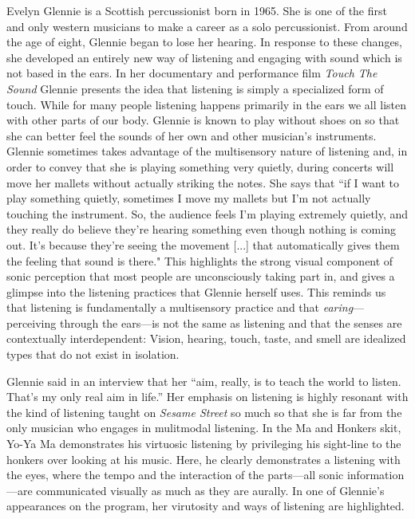 \documentclass[12pt,letterpaper]{article}
\newcommand{\ses}{\textit{Sesame Street }}
\begin{document}
	Evelyn Glennie is a Scottish percussionist born in 
	1965.\autocite[6]{Glennie} She is one of the first and only western 
	musicians to make a career as a solo percussionist. From 
	around the age of eight, Glennie began to lose her 
	hearing.\autocite[40]{Glennie} In response to these changes, she 
	developed an 
	entirely new way of listening and engaging with sound which is not based
	in the ears. In her documentary and performance film \textit{Touch The 
	Sound} Glennie presents the idea that listening is simply a specialized
	form of touch. While for many people listening happens primarily in the
	ears we all listen with other parts of our body. Glennie is known
	to play without shoes on so that she can better feel the sounds of her 
	own and other musician's instruments. Glennie sometimes takes 
	advantage of the
	multisensory nature of listening and, in order to convey that she is 
	playing something very quietly, during concerts will move
	her mallets without actually striking the notes. She says that ``if I 
	want to play something quietly, sometimes I move my mallets but I'm not
	actually touching the instrument. So, the audience feels I'm playing 
	extremely quietly, and they really do believe they're hearing something
	 even though nothing is coming out. It's because they're seeing the 
	movement [...] that automatically gives them the feeling that sound is 
	there." This highlights the strong visual component of sonic perception
	that most people are unconsciously taking part in, and gives a glimpse 
	into the
	listening practices that Glennie herself uses.\autocite[109]{Ceraso}  
	This reminds us that listening is fundamentally a multisensory practice
	and that \textit{earing}---perceiving through the ears---is not the 
	same as listening\autocite[105]{Ceraso} and that the senses are 
	contextually interdependent: Vision, hearing, touch, taste, and smell 
	are idealized types that do not exist in 
	isolation.\autocite[212]{Holmes}
	
	Glennie said in an interview that her ``aim, really, is to teach the 
	world to listen. That's my only real aim in 
	life.''\autocite[172]{Holmes} Her emphasis on listening is highly 
	resonant with the kind of listening taught on
	\ses so much so that she is far from the only musician who engages in
	mulitmodal listening. In the Ma and Honkers skit, Yo-Ya Ma demonstrates
	his virtuosic listening by privileging his sight-line to the honkers 
	over looking at his music. Here, he clearly demonstrates a listening 
	with the eyes, where the tempo and the interaction of the parts---all
	sonic information---are communicated visually as much as they are 
	aurally. In one of Glennie's appearances on the program, her virutosity
	and ways of listening are highlighted.   
\end{document}
